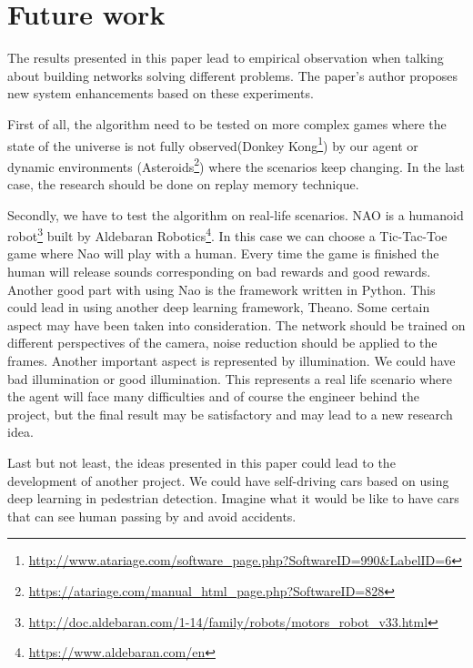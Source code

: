 \chapter{Future work}
\label{chapter:future-work}

The results presented in this paper lead to empirical observation when talking about building networks solving different problems. The paper's author proposes new system enhancements based on these experiments.

First of all, the algorithm need to be tested on more complex games where the state of the universe is not fully observed(Donkey Kong\footnote{\url{http://www.atariage.com/software_page.php?SoftwareID=990&LabelID=6}}) by our agent or dynamic environments (Asteroids\footnote{\url{https://atariage.com/manual_html_page.php?SoftwareID=828}}) where the scenarios keep changing. In the last case, the research should be done on replay memory technique.

Secondly, we have to test the algorithm on real-life scenarios. NAO is a humanoid robot\footnote{\url{http://doc.aldebaran.com/1-14/family/robots/motors_robot_v33.html}} built by Aldebaran Robotics\footnote{\url{https://www.aldebaran.com/en}}. In this case we can choose a Tic-Tac-Toe game where Nao will play with a human. Every time the game is finished the human will release sounds corresponding on bad rewards and good rewards. Another good part with using Nao is the framework written in Python. This could lead in using another deep learning framework, Theano. Some certain aspect may have been taken into consideration. The network should be trained on different perspectives of the camera, noise reduction should be applied to the frames. Another important aspect is represented by illumination. We could have bad illumination or good illumination. This represents a real life scenario where the agent will face many difficulties and of course the engineer behind the project, but the final result may be satisfactory and may lead to a new research idea.

Last but not least, the ideas presented in this paper could lead to the development of another project. We could have self-driving cars based on using deep learning in pedestrian detection. Imagine what it would be like to have cars that can see human passing by and avoid accidents.
